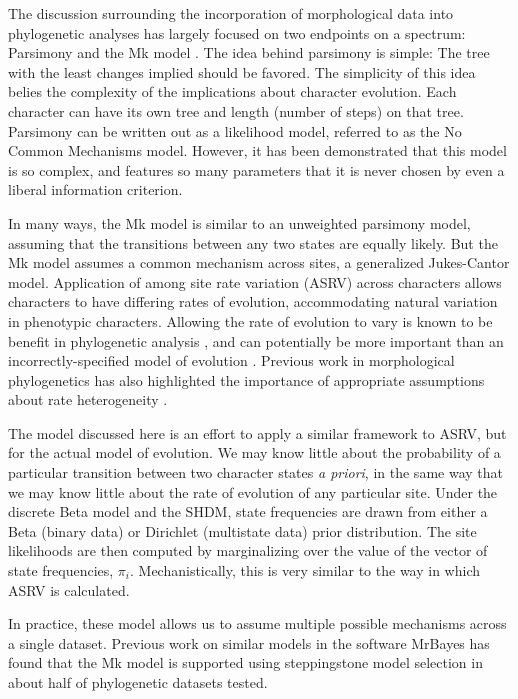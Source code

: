 \documentclass[]{sysbio}
\begin{document}
The discussion surrounding the incorporation of morphological data into phylogenetic analyses has largely focused on two endpoints on a spectrum: Parsimony and the Mk model \citep{lewis2001likelihood}.
The idea behind parsimony is simple: The tree with the least changes implied should be favored.
The simplicity of this idea belies the complexity of the implications about character evolution.
Each character can have its own tree and length (number of steps) on that tree.
Parsimony can be written out as a likelihood model, referred to as the No Common Mechanisms model.
However, it has been demonstrated that this model is so complex, and features so many parameters	that it is never chosen by even a liberal information criterion. \par
In many ways, the Mk model is similar to an unweighted parsimony model, assuming that the transitions between any two states are equally likely.
But the Mk model assumes a common mechanism across sites, a generalized Jukes-Cantor model.
Application of among site rate variation (ASRV) across characters allows characters to have differing rates of evolution, accommodating natural variation in phenotypic characters. 
Allowing the rate of evolution to vary is known to be benefit in phylogenetic analysis \citep{felsenstein78}, and can potentially be more important than an incorrectly-specified model of evolution \citep{lemmon2004importance}.
Previous work in morphological phylogenetics has also highlighted the importance of appropriate assumptions about rate heterogeneity \citep{Harrison2014}.	\par
The model discussed here is an effort to apply a similar framework to ASRV, but for the actual model of evolution. 
We may know little about the probability of a particular transition between two character states \textit{a priori}, in the same way that we may know little about the rate of evolution of any particular site. 
Under the discrete Beta model and the SHDM, state frequencies are drawn from either a Beta (binary data) or Dirichlet (multistate data) prior distribution.
The site likelihoods are then computed by marginalizing over the value of the vector of state frequencies, $\pi_i$.
Mechanistically, this is very similar to the way in which ASRV is calculated. \par
In practice, these model allows us to assume multiple possible mechanisms across a single dataset. 
Previous work on similar models in the software MrBayes \citep{Wright2016} has found that the Mk model is supported using steppingstone model selection in about half of phylogenetic datasets tested.
\end{document}
